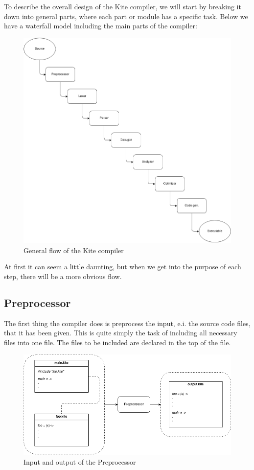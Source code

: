 

To describe the overall design of the Kite compiler, we will start by
breaking it down into general parts, where each part or module has a
specific task. Below we have a waterfall model including the main
parts of the compiler:

\begin{figure}[H]
  \label{fig:flow}
  \center
  \includegraphics[scale=0.45]{images/flow.png}
  \caption{General flow of the Kite compiler}
\end{figure}

At first it can seem a little daunting, but when we get into the
purpose of each step, there will be a more obvious flow.

\subsection{Preprocessor}
The first thing the compiler does is preprocess the input, e.i. the
source code files, that it has been given. This is quite simply the
task of including all necessary files into one file. The files to be
included are declared in the top of the file.

\begin{figure}[H]
  \label{fig:preprocessor}
  \center
  \includegraphics[scale=0.45]{images/preprocessor.png}
  \caption{Input and output of the Preprocessor}
\end{figure}


